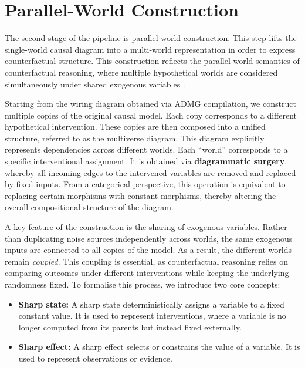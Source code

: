 \documentclass[a4paper]{report}
\begin{document}
\section{Parallel-World Construction}
The second stage of the pipeline is parallel-world construction. This step lifts the single-world causal diagram into a multi-world representation in order to express counterfactual structure. This construction reflects the parallel-world semantics of counterfactual reasoning, where multiple hypothetical worlds are considered simultaneously under shared exogenous variables \cite{shpitser2007counterfactuals}.

Starting from the wiring diagram obtained via ADMG compilation, we construct multiple copies of the original causal model. Each copy corresponds to a different hypothetical intervention. These copies are then composed into a unified structure, referred to as the multiverse diagram. This diagram explicitly represents dependencies across different worlds. Each ``world'' corresponds to a specific interventional assignment. It is obtained via \textbf{diagrammatic surgery}, whereby all incoming edges to the intervened variables are removed and replaced by fixed inputs. From a categorical perspective, this operation is equivalent to replacing certain morphisms with constant morphisms, thereby altering the overall compositional structure of the diagram.

A key feature of the construction is the sharing of exogenous variables. Rather than duplicating noise sources independently across worlds, the same exogenous inputs are connected to all copies of the model. As a result, the different worlds remain \emph{coupled}. This coupling is essential, as counterfactual reasoning relies on comparing outcomes under different interventions while keeping the underlying randomness fixed. To formalise this process, we introduce two core concepts:
\begin{itemize}
\item \textbf{Sharp state:}
A sharp state deterministically assigns a variable to a fixed constant value. It is used to represent interventions, where a variable is no longer computed from its parents but instead fixed externally.

\item \textbf{Sharp effect:}
A sharp effect selects or constrains the value of a variable. It is used to represent observations or evidence.


\end{itemize}
\end{document}
